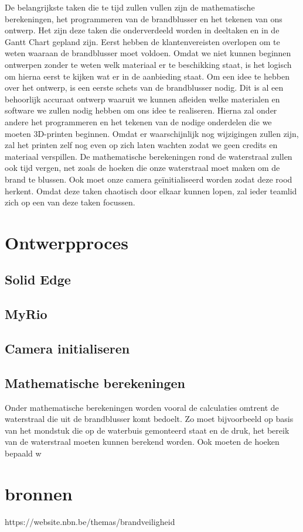 \documentclass{kulakarticle}
\begin{document}
De belangrijkste taken die te tijd zullen vullen zijn de mathematische berekeningen, het programmeren van de brandblusser en het tekenen van ons ontwerp. Het zijn deze taken die onderverdeeld worden in deeltaken en in de Gantt Chart gepland zijn. Eerst hebben de klantenvereisten overlopen om te weten waaraan de brandblusser moet voldoen. Omdat we niet kunnen beginnen ontwerpen zonder te weten welk materiaal er te beschikking staat, is het logisch om hierna eerst te kijken wat er in de aanbieding staat. Om een idee te hebben over het ontwerp, is een eerste schets van de brandblusser nodig. Dit is al een behoorlijk accuraat ontwerp waaruit we kunnen afleiden welke materialen en software we zullen nodig hebben om ons idee te realiseren.  Hierna zal onder andere het programmeren en het tekenen van de nodige onderdelen die we moeten 3D-printen beginnen.
Omdat er waarschijnlijk nog wijzigingen zullen zijn, zal het printen zelf nog even op zich laten wachten zodat we geen credits en materiaal verspillen. De mathematische berekeningen rond de waterstraal zullen ook tijd vergen, net zoals de hoeken die onze waterstraal moet maken om de brand te blussen.  Ook moet onze camera geïnitialiseerd worden zodat deze rood herkent.  Omdat deze taken chaotisch door elkaar kunnen lopen,  zal ieder teamlid zich op een van deze taken focussen. 





\section{Ontwerpproces}



\subsection{Solid Edge}

\subsection{MyRio}


\subsection{Camera initialiseren}

\subsection{Mathematische berekeningen}

Onder mathematische berekeningen worden vooral de calculaties omtrent de waterstraal die uit de brandblusser komt bedoelt. Zo moet bijvoorbeeld op basis van het mondstuk die op de waterbuis gemonteerd staat en de druk, het bereik van de waterstraal moeten kunnen berekend worden. Ook moeten de hoeken bepaald w
 

\section*{bronnen}
https://website.nbn.be/themas/brandveiligheid
\end{document}
